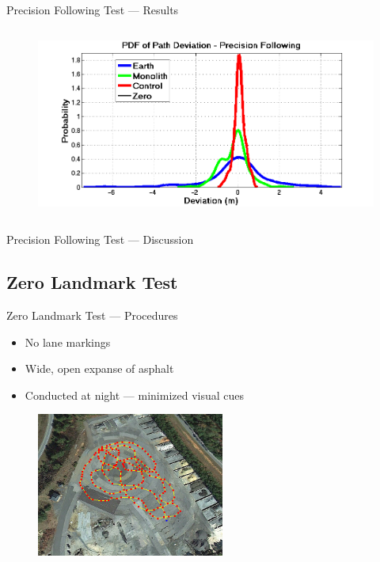 \documentclass{beamer}
\begin{document}
\begin{frame}{Precision Following Test --- Results}
\begin{columns}
\begin{column}{0.5\textwidth}
\begin{figure}
          \end{figure}
          \vspace{-20pt}
          \begin{figure}
            \includegraphics[width=\textwidth]{../graphics/precision_following_dev_pdf.png}
          \end{figure}
        \end{column}
      \end{columns}
    \end{frame}

    \begin{frame}{Precision Following Test --- Discussion}
    \end{frame}


  \subsection{Zero Landmark Test}
    \begin{frame}{Zero Landmark Test --- Procedures}
      \begin{itemize}
        \item No lane markings
        \item Wide, open expanse of asphalt
        \item Conducted at night --- minimized visual cues
      \end{itemize}
      \begin{figure}
        \centering
        \includegraphics[width=0.55\textwidth]{../graphics/zero_landmark_path.png}
      \end{figure}     
    \end{frame}
\end{document}
